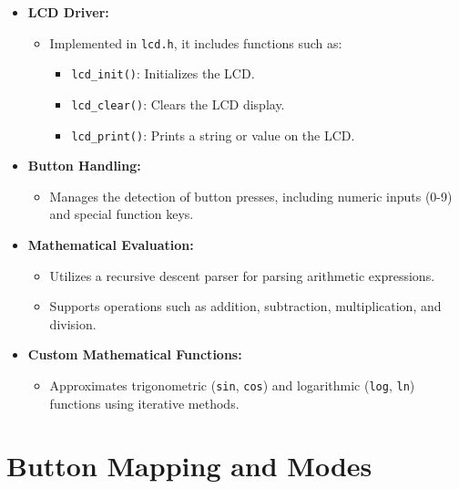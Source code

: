 
\begin{itemize}
    \item \textbf{LCD Driver:} 
    \begin{itemize}
        \item Implemented in \texttt{lcd.h}, it includes functions such as:
        \begin{itemize}
            \item \texttt{lcd\_init()}: Initializes the LCD.
            \item \texttt{lcd\_clear()}: Clears the LCD display.
            \item \texttt{lcd\_print()}: Prints a string or value on the LCD.
        \end{itemize}
    \end{itemize}
    
    \item \textbf{Button Handling:} 
    \begin{itemize}
        \item Manages the detection of button presses, including numeric inputs (0-9) and special function keys.
    \end{itemize}
    
    \item \textbf{Mathematical Evaluation:} 
    \begin{itemize}
        \item Utilizes a recursive descent parser for parsing arithmetic expressions.
        \item Supports operations such as addition, subtraction, multiplication, and division.
    \end{itemize}
    
    \item \textbf{Custom Mathematical Functions:} 
    \begin{itemize}
        \item Approximates trigonometric (\texttt{sin}, \texttt{cos}) and logarithmic (\texttt{log}, \texttt{ln}) functions using iterative methods.
    \end{itemize}
\end{itemize}

\section*{Button Mapping and Modes}

